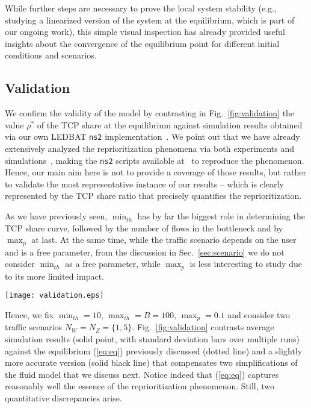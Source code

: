 \documentclass[conference]{IEEEtran}
\newcommand{\secR}[1]{Sec.~\ref{sec:#1}}
\newcommand{\secL}[1]{\label{sec:#1}}
\newcommand{\eqR}[1]{(\ref{eq:#1})}
\newcommand{\figR}[1]{Fig.~\ref{fig:#1}}
\newcommand{\figLC}[2]{
		\caption{#2}
		\label{fig:#1}
}
\begin{document}
While further steps are necessary to prove the local system stability (e.g., studying a linearized version of the system at the equilibrium, which is part of our ongoing work), this simple visual inspection has already provided useful insights about the convergence of the equilibrium point for different initial conditions and scenarios.


\subsection{Validation}\secL{validation}

We confirm the validity of the model by contrasting in \figR{validation} the value $\rho^*$ of the TCP share at the equilibrium against simulation results obtained via our own LEDBAT \verb!ns2! implementation~\cite{ledbat_code}. 
We point out that we have already extensively analyzed the reprioritization phenomena via both experiments and simulations~\cite{tma13}, making the \verb!ns2! scripts available at~\cite{ledbat_interaction} to reproduce the phenomenon. Hence, our main aim here is not to provide a coverage of those results, but rather to validate the most representative instance of our results -- which is clearly represented by the TCP share ratio that precisely quantifies the reprioritization.

As we have previously seen, $\min_{th}$ has by far the biggest role in determining the TCP share curve, followed by the number of flows in the bottleneck and by $\max_{p}$ at last. At the same time, while the traffic scenario depends on the user and is a free parameter, from the discussion in \secR{scenario} we do not consider $\min_{th}$ as a free parameter, while $\max_{p}$ is less interesting to study due to its more limited impact.




\begin{figure*}[t]
    \begin{center}
\texttt{[image: validation.eps]}
        \figLC{validation}{Simulation validation of TCP share ratio $\rho^*$ at the equilibrium as a function of $\tau$ for various traffic scenarios   $N_W=N_Z=\{1,5\}$.}
    \end{center}
\end{figure*}

Hence, we fix $\min_{th}=10$, $\max_{th}=B=100$,  $\max_{p}=0.1$ and consider two traffic scenarios $N_W=N_Z=\{1,5\}$. \figR{validation} contrasts average simulation results (solid point, with standard deviation bars over multiple runs) against the equilibrium \eqR{eq} previously discussed (dotted line) and a slightly more accurate version (solid black line) that compensates two simplifications of the fluid model that we discuss next. 
Notice indeed that \eqR{eq} captures reasonably well the essence of the reprioritization phenomenon. Still, two quantitative discrepancies arise.
\end{document}
